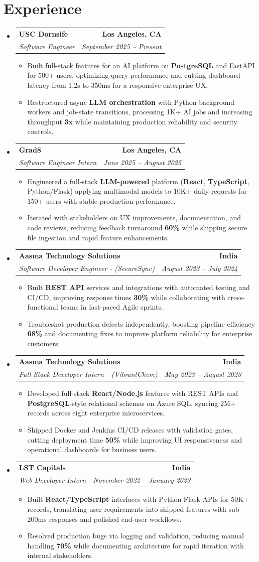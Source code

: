 \documentclass[letterpaper,10pt]{article}
\makeatletter
\newcommand{\resumeItem}[1]{\item\small{{#1 \vspace{-2pt}}}}
\newcommand{\resumeSubheading}[4]{\vspace{-1pt}\item\begin{tabular*}{1.0\textwidth}[t]{l@{\extracolsep{\fill}}r}\textbf{#1} & \textbf{\small #2} \\\textit{\small#3} & \textit{\small #4} \\\end{tabular*}\vspace{-2pt}}
\newcommand{\resumeSubHeadingListStart}{\begin{itemize}[leftmargin=0.0in, label={}]}
\newcommand{\resumeSubHeadingListEnd}{\end{itemize}}
\newcommand{\resumeItemListStart}{\begin{itemize}[leftmargin=0.15in,label=\textbullet,itemsep=2pt,topsep=0pt,parsep=0pt,partopsep=0pt]}
\newcommand{\resumeItemListEnd}{\end{itemize}\vspace{-4pt}}
\makeatother
\begin{document}
\section{Experience}
\resumeSubHeadingListStart
\resumeSubheading{USC Dornsife}{Los Angeles, CA}{Software Engineer}{September 2025 -- Present}
\resumeItemListStart
\resumeItem{Built full-stack features for an AI platform on \textbf{PostgreSQL} and FastAPI for 500+ users, optimizing query performance and cutting dashboard latency from 1.2s to 350ms for a responsive enterprise UX.}
\resumeItem{Restructured async \textbf{LLM orchestration} with Python background workers and job-state transitions, processing 1K+ AI jobs and increasing throughput \textbf{3x} while maintaining production reliability and security controls.}
\resumeItemListEnd
\resumeSubheading{Grad8}{Los Angeles, CA}{Software Engineer Intern}{June 2025 -- August 2025}
\resumeItemListStart
\resumeItem{Engineered a full-stack \textbf{LLM-powered} platform (\textbf{React}, \textbf{TypeScript}, Python/Flask) applying multimodal models to 10K+ daily requests for 150+ users with stable production performance.}
\resumeItem{Iterated with stakeholders on UX improvements, documentation, and code reviews, reducing feedback turnaround \textbf{60\%} while shipping secure file ingestion and rapid feature enhancements.}
\resumeItemListEnd
\resumeSubheading{Aasma Technology Solutions}{India}{Software Developer Engineer - (SecureSync)}{August 2023 -- July 2024}
\resumeItemListStart
\resumeItem{Built \textbf{REST API} services and integrations with automated testing and CI/CD, improving response times \textbf{30\%} while collaborating with cross-functional teams in fast-paced Agile sprints.}
\resumeItem{Troubleshot production defects independently, boosting pipeline efficiency \textbf{68\%} and documenting fixes to improve platform reliability for enterprise customers.}
\resumeItemListEnd
\resumeSubheading{Aasma Technology Solutions}{India}{Full Stack Developer Intern - (VibrantChem)}{May 2023 -- August 2023}
\resumeItemListStart
\resumeItem{Developed full-stack \textbf{React/Node.js} features with REST APIs and \textbf{PostgreSQL}-style relational schemas on Azure SQL, syncing 2M+ records across eight enterprise microservices.}
\resumeItem{Shipped Docker and Jenkins CI/CD releases with validation gates, cutting deployment time \textbf{50\%} while improving UI responsiveness and operational dashboards for business users.}
\resumeItemListEnd
\resumeSubheading{LST Capitals}{India}{Web Developer Intern}{November 2022 -- January 2023}
\resumeItemListStart
\resumeItem{Built \textbf{React/TypeScript} interfaces with Python Flask APIs for 50K+ records, translating user requirements into shipped features with sub-200ms responses and polished end-user workflows.}
\resumeItem{Resolved production bugs via logging and validation, reducing manual handling \textbf{70\%} while documenting architecture for rapid iteration with internal stakeholders.}
\resumeItemListEnd
\resumeSubHeadingListEnd
\vspace{-6pt}
\end{document}
